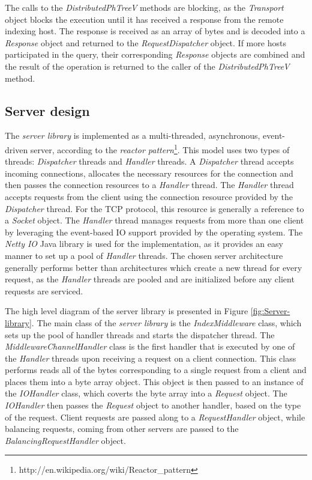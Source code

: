 \documentclass[11pt,a4paper]{globis-book}
\begin{document}
The calls to the \textit{DistributedPhTreeV} methods are blocking, as the \textit{Transport} object blocks the execution until it has received a response from the remote indexing host. The response is received as an array of bytes and is decoded into a \textit{Response} object and returned to the \textit{RequestDispatcher} object. If more hosts participated in the query, their corresponding \textit{Response} objects are combined and the result of the operation is returned to the caller of the \textit{DistributedPhTreeV} method. 

\subsection{Server design}

The \textit{server library} is implemented as a multi-threaded, asynchronous, event-driven server, according to the \textit{reactor pattern}\footnote{http://en.wikipedia.org/wiki/Reactor\_pattern}. This model uses two types of threads: \textit{Dispatcher} threads and \textit{Handler} threads. A \textit{Dispatcher} thread accepts incoming connections, allocates the necessary resources for the connection and then passes the connection resources to a \textit{Handler} thread. The \textit{Handler} thread accepts requests from the client using the connection resource provided by the \textit{Dispatcher} thread. For the TCP protocol, this resource is generally a reference to a \textit{Socket} object. The \textit{Handler} thread manages requests from more than one client by leveraging the event-based IO support provided by the operating system. The \textit{Netty IO} Java library is used for the implementation, as it provides an easy manner to set up a pool of \textit{Handler} threads. The chosen server architecture generally performs better than architectures which create a new thread for every request, as the \textit{Handler} threads are pooled and are initialized before any client requests are serviced. 

The high level diagram of the server library is presented in Figure \ref{fig:Server-library}. The main class of the \textit{server library} is the \textit{IndexMiddleware} class, which sets up the pool of handler threads and starts the dispatcher thread. The \textit{MiddlewareChannelHandler} class is the first handler that is executed by one of the \textit{Handler} threads upon receiving a request on a client connection. This class performs reads all of the bytes corresponding to a single request from a client and places them into a byte array object. This object is then passed to an instance of the \textit{IOHandler} class, which coverts the byte array into a \textit{Request} object. The \textit{IOHandler} then passes the \textit{Request} object to another handler, based on the type of the request. Client requests are passed along to a \textit{RequestHandler} object, while balancing requests, coming from other servers are passed to the \textit{BalancingRequestHandler} object. 
\end{document}
